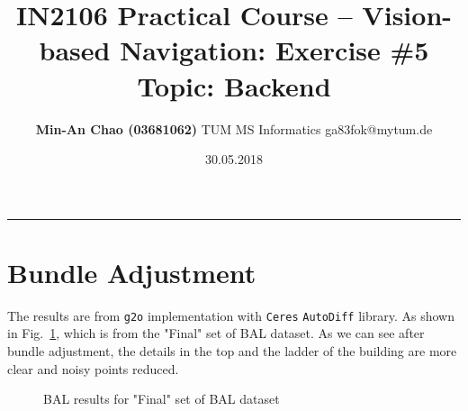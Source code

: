 \documentclass[12pt,a4paper]{article}
\makeatletter
\newcommand{\docTitle}{IN2106 Practical Course -- Vision-based Navigation: Exercise \#5}
\newcommand{\docSubtitle}{Topic: Backend}
\newcommand{\docAuthor}{Min-An Chao (03681062)}
\newcommand{\docAuthorDept}{TUM MS Informatics}
\newcommand{\docAuthorEmail}{ga83fok@mytum.de}
\newcommand{\docDate}{30.05.2018}
\makeatother
\begin{document}
    \title{\vspace{-1.75cm} \large \textsf{\textbf{\docTitle}}\\ \textsf{\docSubtitle}}
    \author{\normalsize \textsf{
        \textbf{\docAuthor} \hspace{6pt}\textbar\hspace{6pt}
        \docAuthorDept \hspace{6pt}\textbar\hspace{6pt}
        \docAuthorEmail}}
    \date{\small \textsf{\docDate}}
    \maketitle 
    \thispagestyle{fancy}
    \vspace{-0.5cm}
    \hrule
    
    \section{Bundle Adjustment}
    The results are from \texttt{g2o} implementation 
    with \texttt{Ceres} \texttt{AutoDiff} library.
    As shown in Fig.~\ref{fig:bal}, 
    which is from the "Final" set of BAL dataset.
    As we can see after bundle adjustment, 
    the details in the top and the ladder of the building
    are more clear and noisy points reduced.

    \begin{figure}[!ht]
        \centering
        \caption{BAL results for "Final" set of BAL dataset}
        \label{fig:bal}
    \end{figure}
\end{document}
